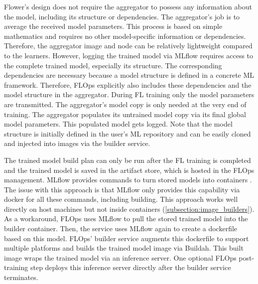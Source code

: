 Flower's design does not require the aggregator to possess any information about the model, including its structure or dependencies.
The aggregator's job is to average the received model parameters.
This process is based on simple mathematics and requires no other model-specific information or dependencies.
Therefore, the aggregator image and node can be relatively lightweight compared to the learners.
However, logging the trained model via MLflow requires access to the complete trained model, especially its structure.
The corresponding dependencies are necessary because a model structure is defined in a concrete ML framework.
Therefore, FLOps explicitly also includes these dependencies and the model structure in the aggregator.
During FL training only the model parameters are transmitted.
The aggregator's model copy is only needed at the very end of training.
The aggregator populates its untrained model copy via its final global model parameters.
This populated model gets logged.
Note that the model structure is initially defined in the user's ML repository and can be easily cloned and injected into images via the builder service.

The trained model build plan can only be run after the FL training is completed and the trained model is saved in the artifact store, which is hosted in the FLOps management.
MLflow provides commands to turn stored models into containers \cite{docs:mlfow_docker_cmds}.
The issue with this approach is that MLflow only provides this capability via docker for all these commands, including building.
This approach works well directly on host machines but not inside containers (\ref{subsection:image_builders}).
As a workaround, FLOps uses MLflow to pull the stored trained model into the builder container.
Then, the service uses MLflow again to create a dockerfile based on this model.
FLOps' builder service augments this dockerfile to support multiple platforms and builds the trained model image via Buildah.
This built image wraps the trained model via an inference server.
One optional FLOps post-training step deploys this inference server directly after the builder service terminates.

